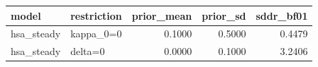 \begin{tabular}{llrrr}
\toprule
model & restriction & prior\_mean & prior\_sd & sddr\_bf01 \\
\midrule
hsa\_steady & kappa\_0=0 & 0.1000 & 0.5000 & 0.4479 \\
hsa\_steady & delta=0 & 0.0000 & 0.1000 & 3.2406 \\
\bottomrule
\end{tabular}
